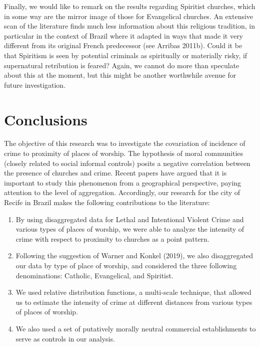 \documentclass[smallextended]{svjour3}       %
\begin{document}
Finally, we would like to remark on the results regarding Spiritist
churches, which in some way are the mirror image of those for
Evangelical churches. An extensive scan of the literature finds much
less information about this religious tradition, in particular in the
context of Brazil where it adapted in ways that made it very different
from its original French predecessor (see Arribas 2011b). Could it be
that Spiritism is seen by potential criminals as spiritually or
materially risky, if supernatural retribution is feared? Again, we
cannot do more than speculate about this at the moment, but this might
be another worthwhile avenue for future investigation.

\hypertarget{conclusions}{%
\section{Conclusions}\label{conclusions}}

The objective of this research was to investigate the covariation of
incidence of crime to proximity of places of worship. The hypothesis of
moral communities (closely related to social informal controls) posits a
negative correlation between the presence of churches and crime. Recent
papers have argued that it is important to study this phenomenon from a
geographical perspective, paying attention to the level of aggregation.
Accordingly, our research for the city of Recife in Brazil makes the
following contributions to the literature:

\begin{enumerate}
\def\labelenumi{\arabic{enumi}.}
\item
  By using disaggregated data for Lethal and Intentional Violent Crime
  and various types of places of worship, we were able to analyze the
  intensity of crime with respect to proximity to churches as a point
  pattern.
\item
  Following the suggestion of Warner and Konkel (2019), we also
  disaggregated our data by type of place of worship, and considered the
  three following denominations: Catholic, Evangelical, and Spiritist.
\item
  We used relative distribution functions, a multi-scale technique, that
  allowed us to estimate the intensity of crime at different distances
  from various types of places of worship.
\item
  We also used a set of putatively morally neutral commercial
  establishments to serve as controls in our analysis.
\end{enumerate}
\end{document}

